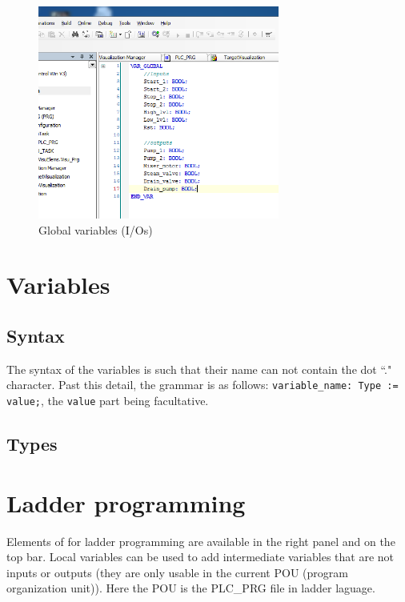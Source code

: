 \documentclass[10pt,a4paper]{article}
\begin{document}
\begin{figure}[h!]
	\begin{center}
		\includegraphics[width=300px]{img6.PNG}
	\end{center}
\caption{Global variables (I/Os)}
\label{fig:glob_var}
\end{figure}


\section{Variables}

\subsection{Syntax}
The syntax of the variables is such that their name can not contain the dot ``." character.
Past this detail, the grammar is as follows: \texttt{variable\_name: Type := value;}, the \texttt{value} part being facultative.

\subsection{Types}


\section{Ladder programming}

Elements of for ladder programming are available in the right panel and on the top bar.
Local variables can be used to add intermediate variables that are not inputs or outputs (they are only usable in the current POU (program organization unit)). Here the POU is the PLC\_PRG file in ladder laguage.
\end{document}
